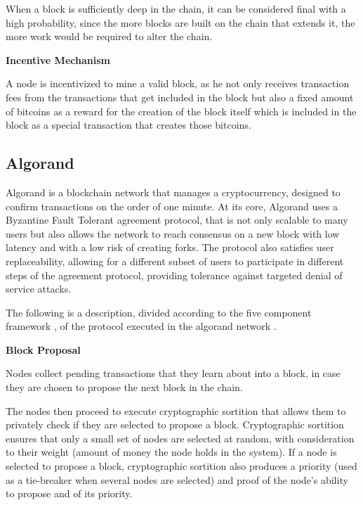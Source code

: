 When a block is sufficiently deep in the chain, it can be considered final with a high probability, since the more blocks are built on the chain that extends it, the more work would be required to alter the chain.


\vspace{0.25cm}

\textbf{Incentive Mechanism}

A node is incentivized to mine a valid block, as he not only receives transaction fees from the transactions that get included in the block but also a fixed amount of bitcoins as a reward for the creation of the block itself which is included in the block as a special transaction that creates those bitcoins.




\subsection{Algorand}

Algorand \cite{algorand_scale_byz_agreements} \cite{algorand_agreement} is a blockchain network that manages a cryptocurrency, designed to confirm transactions on the order of one minute. At its core, Algorand uses a Byzantine Fault Tolerant agreement protocol, that is not only scalable to many users but also allows the network to reach consensus on a new block with low latency and with a low risk of creating forks. The protocol also satisfies user replaceability, allowing for a different subset of users to participate in different steps of the agreement protocol, providing tolerance against targeted denial of service attacks.

The following is a description, divided according to the five component framework \cite{survey_bchain_networks}, of the protocol executed in the algorand network \cite{algorand_scale_byz_agreements} \cite{algorand_agreement}.


\vspace{0.5cm}

\textbf{Block Proposal}

Nodes collect pending transactions that they learn about into a block, in case they are chosen to propose the next block in the chain.

The nodes then proceed to execute cryptographic sortition that allows them to privately check if they are selected to propose a block. Cryptographic sortition ensures that only a small set of nodes are selected at random, with consideration to their weight (amount of money the node holds in the system). If a node is selected to propose a block, cryptographic sortition also produces a priority (used as a tie-breaker when several nodes are selected) and proof of the node’s ability to propose and of its priority.

